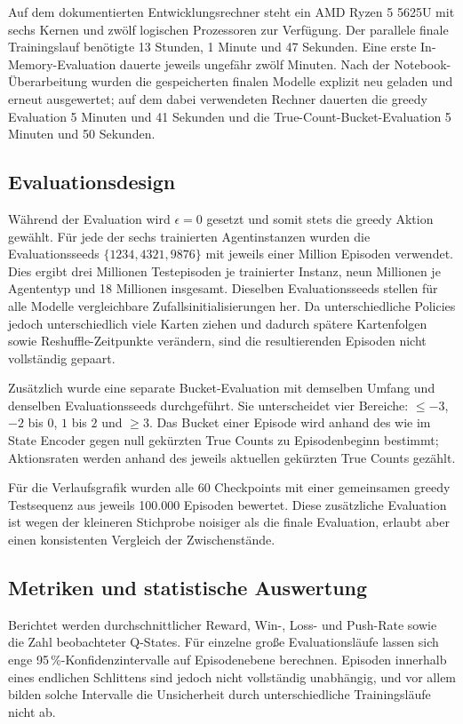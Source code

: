 Auf dem dokumentierten Entwicklungsrechner steht ein AMD Ryzen 5
5625U mit sechs Kernen und zwölf logischen Prozessoren zur Verfügung.
Der parallele finale Trainingslauf benötigte 13 Stunden, 1 Minute und
47 Sekunden. Eine erste In-Memory-Evaluation dauerte jeweils ungefähr
zwölf Minuten. Nach der Notebook-Überarbeitung wurden die
gespeicherten finalen Modelle explizit neu geladen und erneut
ausgewertet; auf dem dabei verwendeten Rechner dauerten die greedy
Evaluation 5 Minuten und 41 Sekunden und die
True-Count-Bucket-Evaluation 5 Minuten und 50 Sekunden.

\subsection{Evaluationsdesign}

Während der Evaluation wird $\epsilon=0$ gesetzt und somit stets die
greedy Aktion gewählt. Für jede der sechs trainierten Agentinstanzen
wurden die Evaluationsseeds $\{1234,4321,9876\}$ mit jeweils einer
Million Episoden verwendet. Dies ergibt drei Millionen Testepisoden
je trainierter Instanz, neun Millionen je Agententyp und 18 Millionen
insgesamt. Dieselben Evaluationsseeds stellen für alle Modelle
vergleichbare Zufallsinitialisierungen her. Da unterschiedliche
Policies jedoch unterschiedlich viele Karten ziehen und dadurch
spätere Kartenfolgen sowie Reshuffle-Zeitpunkte verändern, sind die
resultierenden Episoden nicht vollständig gepaart.

Zusätzlich wurde eine separate Bucket-Evaluation mit demselben Umfang
und denselben Evaluationsseeds durchgeführt. Sie unterscheidet vier
Bereiche: $\leq -3$, $-2$ bis $0$, $1$ bis $2$ und $\geq 3$. Das
Bucket einer Episode wird anhand des wie im State Encoder gegen null
gekürzten True Counts zu Episodenbeginn bestimmt; Aktionsraten werden
anhand des jeweils aktuellen gekürzten True Counts gezählt.

Für die Verlaufsgrafik wurden alle 60 Checkpoints mit einer
gemeinsamen greedy Testsequenz aus jeweils 100.000 Episoden bewertet.
Diese zusätzliche Evaluation ist wegen der kleineren Stichprobe
noisiger als die finale Evaluation, erlaubt aber einen konsistenten
Vergleich der Zwischenstände.

\subsection{Metriken und statistische Auswertung}

Berichtet werden durchschnittlicher Reward, Win-, Loss- und Push-Rate
sowie die Zahl beobachteter Q-States. Für einzelne große
Evaluationsläufe lassen sich enge 95\,\%-Konfidenzintervalle auf
Episodenebene berechnen. Episoden innerhalb eines endlichen
Schlittens sind jedoch nicht vollständig unabhängig, und vor allem
bilden solche Intervalle die Unsicherheit durch unterschiedliche
Trainingsläufe nicht ab.

